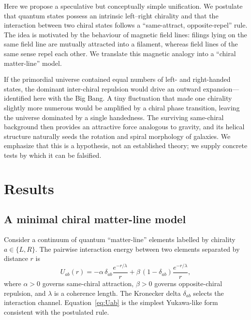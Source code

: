 \documentclass[a4paper,10pt]{article}
\begin{document}
Here we propose a speculative but conceptually simple unification. We
postulate that quantum states possess an intrinsic left--right chirality and
that the interaction between two chiral states follows a
``same-attract, opposite-repel'' rule. The idea is motivated by the behaviour
of magnetic field lines: filings lying on the same field line are mutually
attracted into a filament, whereas field lines of the same sense repel each
other. We translate this magnetic analogy into a ``chiral matter-line''
model.

If the primordial universe contained equal numbers of left- and right-handed
states, the dominant inter-chiral repulsion would drive an outward
expansion---identified here with the Big Bang. A tiny fluctuation that made
one chirality slightly more numerous would be amplified by a chiral phase
transition, leaving the universe dominated by a single handedness. The
surviving same-chiral background then provides an attractive force analogous
to gravity, and its helical structure naturally seeds the rotation and spiral
morphology of galaxies. We emphasize that this is a hypothesis, not an
established theory; we supply concrete tests by which it can be falsified.

\section{Results}

\subsection{A minimal chiral matter-line model}

Consider a continuum of quantum ``matter-line'' elements labelled by chirality
$a\in\{L,R\}$. The pairwise interaction energy between two elements separated
by distance $r$ is
\begin{equation}
U_{ab}(r)=-\alpha\,\delta_{ab}\frac{e^{-r/\lambda}}{r}
+\beta\,(1-\delta_{ab})\frac{e^{-r/\lambda}}{r},
\label{eq:Uab}
\end{equation}
where $\alpha>0$ governs same-chiral attraction, $\beta>0$ governs
opposite-chiral repulsion, and $\lambda$ is a coherence length. The Kronecker
delta $\delta_{ab}$ selects the interaction channel. Equation~\eqref{eq:Uab}
is the simplest Yukawa-like form consistent with the postulated rule.
\end{document}
